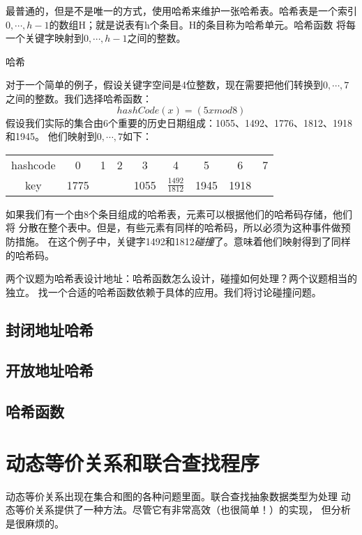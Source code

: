 最普通的，但是不是唯一的方式，使用哈希来维护一张哈希表。哈希表是一个索引
$0, \cdots, h-1$的数组H；就是说表有h个条目。H的条目称为哈希单元。哈希函数
将每一个关键字映射到$0,\cdots,h-1$之间的整数。

\begin{example}
哈希

对于一个简单的例子，假设关键字空间是4位整数，现在需要把他们转换到$0, \cdots, 7$
之间的整数。我们选择哈希函数：
\begin{displaymath}
hashCode(x)=(5x mod 8)
\end{displaymath}
假设我们实际的集合由6个重要的历史日期组成：1055、1492、1776、1812、1918和1945。
他们映射到$0,\cdots,7$如下：

\begin{tabular}{ccccccccc}
\hline
hashcode  &0      &1  &2  &3     &4                     &5     &6     &7\\
key       &1775   &   &   &1055  &$\frac{1492}{1812}$   &1945  &1918  & \\
\hline
\end{tabular}


如果我们有一个由8个条目组成的哈希表，元素可以根据他们的哈希码存储，他们将
分散在整个表中。但是，有些元素有同样的哈希码，所以必须为这种事件做预防措施。
在这个例子中，关键字1492和1812\emph{碰撞}了。意味着他们映射得到了同样的哈希码。
\end{example}

两个议题为哈希表设计地址：哈希函数怎么设计，碰撞如何处理？两个议题相当的独立。
找一个合适的哈希函数依赖于具体的应用。我们将讨论碰撞问题。
\subsection{封闭地址哈希}
\subsection{开放地址哈希}
\subsection{哈希函数}

\section{动态等价关系和联合查找程序}\label{Sec:DynamicEquivalenceRelationAndUnionSearch}
动态等价关系出现在集合和图的各种问题里面。联合查找抽象数据类型为处理
动态等价关系提供了一种方法。尽管它有非常高效（也很简单！）的实现，
但分析是很麻烦的。

